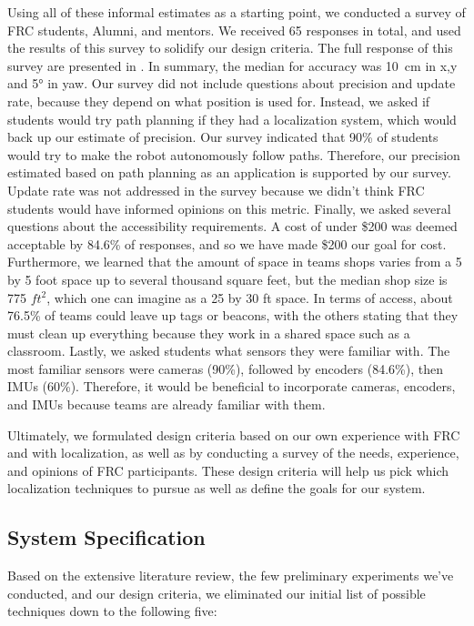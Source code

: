 \documentclass{article}
\begin{document}
    Using all of these informal estimates as a starting point, we conducted a survey of FRC students, Alumni, and mentors. We received 65 responses in total, and used the results of this survey to solidify our design criteria. The full response of this survey are presented in . In summary, the median for accuracy was \SI{10}{\centi\meter} in x,y and \ang{5} in yaw. Our survey did not include questions about precision and update rate, because they depend on what position is used for. Instead, we asked if students would try path planning if they had a localization system, which would back up our estimate of precision. Our survey indicated that 90\% of students would try to make the robot autonomously follow paths. Therefore, our precision estimated based on path planning as an application is supported by our survey. Update rate was not addressed in the survey because we didn't think FRC students would have informed opinions on this metric. Finally, we asked several questions about the accessibility requirements. A cost of under \$200 was deemed acceptable by 84.6\% of responses, and so we have made \$200 our goal for cost. Furthermore, we learned that the amount of space in teams shops varies from a 5 by 5 foot space up to several thousand square feet, but the median shop size is 775 $ft^2$, which one can imagine as a 25 by 30 ft space. In terms of access, about 76.5\% of teams could leave up tags or beacons, with the others stating that they must clean up everything because they work in a shared space such as a classroom. Lastly, we asked students what sensors they were familiar with. The most familiar sensors were cameras (90\%), followed by encoders (84.6\%), then IMUs (60\%). Therefore, it would be beneficial to incorporate cameras, encoders, and IMUs because teams are already familiar with them.

    Ultimately, we formulated design criteria based on our own experience with FRC and with localization, as well as by conducting a survey of the needs, experience, and opinions of FRC participants. These design criteria will help us pick which localization techniques to pursue as well as define the goals for our system.

  \subsection{System Specification}\label{section:system_spec}

    Based on the extensive literature review, the few preliminary experiments we've conducted, and our design criteria, we eliminated our initial list of possible techniques down to the following five:
\end{document}
